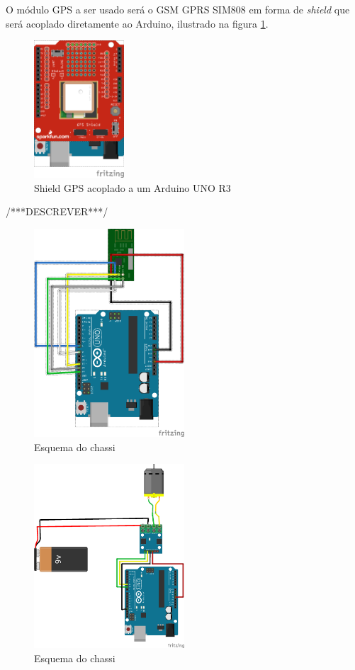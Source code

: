 O módulo GPS a ser usado será o GSM GPRS SIM808 em forma de\textit{ shield} que será acoplado diretamente ao Arduino, ilustrado na figura \ref{fig:gps:vaa}.
\begin{figure}[H]
    \centering
    \includegraphics[width=0.3\textwidth]{figuras/arduinoGPS_bb.png}
    \caption{Shield GPS acoplado a um Arduino UNO R3}
    \label{fig:gps:vaa}
\end{figure}


/***DESCREVER***/

\begin{figure}[H]
    \centering
    \includegraphics[width=0.5\textwidth]{figuras/radio_bb.png}
    \caption{Esquema do chassi}
    \label{fig:sketchup:vaa}
\end{figure}

\begin{figure}[H]
    \centering
    \includegraphics[width=0.5\textwidth]{figuras/motor_bb.png}
    \caption{Esquema do chassi}
    \label{fig:sketchup:vaa}
\end{figure}

